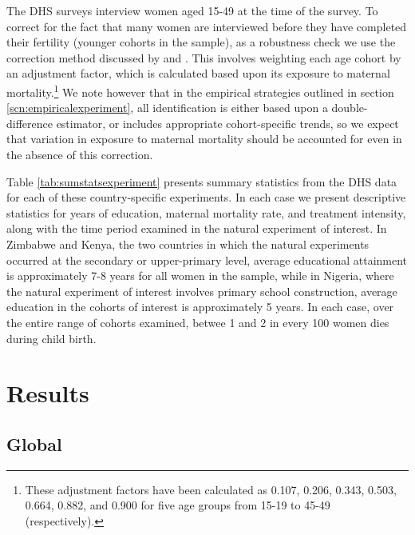 \documentclass{article}[12pt,subeqn]
\begin{document}
\begin{spacing}{1.4}
The DHS surveys interview women aged 15-49 at the time of the survey. To correct for the fact that many
women are interviewed before they have completed their fertility (younger cohorts in the sample), as a robustness
check we use the correction method discussed by \citet{RutsteinRojas2006} and \citet{Stantonetal1997}. This
involves weighting each age cohort by an adjustment factor, which is calculated based upon its exposure to
maternal mortality.\footnote{These adjustment factors have been calculated as 0.107, 0.206, 0.343, 0.503, 0.664, 
0.882, and 0.900 for five age groups from 15-19 to 45-49 (respectively).}  We note however that in the empirical 
strategies outlined in section \ref{scn:empiricalexperiment}, all identification is either based upon a 
double-difference estimator, or includes appropriate cohort-specific trends, so we expect that variation in
exposure to maternal mortality should be accounted for even in the absence of this correction.

Table \ref{tab:sumstatsexperiment} presents summary statistics from the DHS data for each of these 
country-specific experiments.  In each case we present descriptive statistics for years of education, 
maternal mortality rate, and treatment intensity, along with the time period examined in the natural 
experiment of interest.  In Zimbabwe and Kenya, the two countries in which the natural experiments occurred
at the secondary or upper-primary level, average educational attainment is approximately 7-8 years
for all women in the sample, while in Nigeria, where the natural experiment of interest involves primary
school construction, average education in the cohorts of interest is approximately 5 years.  In each
case, over the entire range of cohorts examined, betwee 1 and 2 in every 100 women dies during child birth.



\section{Results}
\subsection{Global}

\end{spacing}
\end{document}
